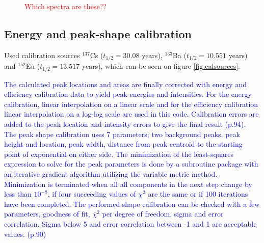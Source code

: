 \begin{figure}%
    \centering
    \quad
    \caption{\textcolor{red}{Which spectra are these??  }}%
    \label{fig:193mPt_spectra}%
\end{figure}


\subsection{Energy and peak-shape calibration} \label{subsec:fitz_calibration}
Used calibration sources $^{137}$Cs ($t_{1/2}=30.08$ years\cite{Browne2007}), $^{133}$Ba ($t_{1/2}=10.551$ years\cite{Khazov2011}) and $^{152}$Eu ($t_{1/2}=13.517$ years\cite{Martin2013}), which can be seen on figure \ref{fig:calsources}.

\textcolor{blue}{The calculated peak locations and areas are finally corrected with energy and efficiency calibration data to yield peak energies and intensities. For the energy calibration, linear interpolation on a linear scale and for the efficiency calibration linear interpolation on a log-log scale are used in this code. Calibration errors are added to the peak location and intensity errors to give the final result (p.94). \\ The peak shape calibration uses 7 parameters; two background peaks, peak height and location, peak width, distance from peak centroid to the starting point of exponential on either side. The minimization of the least-squares expression to solve for the peak parameters is done by a subroutine package  with an iterative gradient algorithm utilizing the variable metric method. Minimization is terminated when all all components in the next step change by less than $10^{-8}$, if four succeeding values of $\chi^2$ are the same or if 100 iterations have been completed. The performed shape calibration can be checked with a few parameters, goodness of fit, $\chi^2$ per degree of freedom, sigma and error correlation. Sigma below 5 and error correlation between -1 and 1 are acceptable values.  (p.90)} \\


